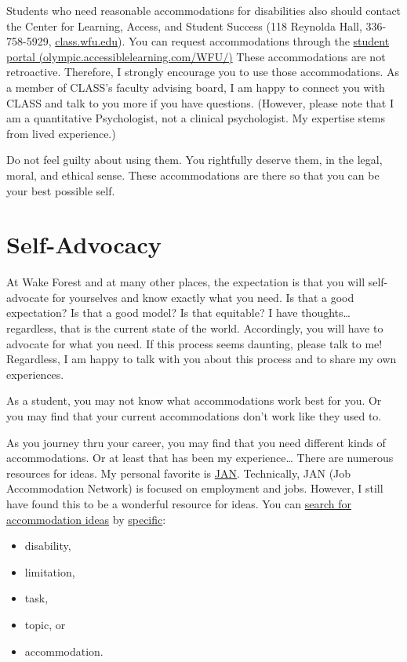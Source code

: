 \documentclass[
]{book}
\providecommand{\tightlist}{%
  \setlength{\itemsep}{0pt}\setlength{\parskip}{0pt}}
\begin{document}
Students who need reasonable accommodations for disabilities also should contact the Center for Learning, Access, and Student Success (118 Reynolda Hall, 336-758-5929, \href{https://class.wfu.edu/}{class.wfu.edu}). You can request accommodations through the \href{https://olympic.accessiblelearning.com/WFU/}{student portal (olympic.accessiblelearning.com/WFU/)} These accommodations are not retroactive. Therefore, I strongly encourage you to use those accommodations. As a member of CLASS's faculty advising board, I am happy to connect you with CLASS and talk to you more if you have questions. (However, please note that I am a quantitative Psychologist, not a clinical psychologist. My expertise stems from lived experience.)

Do not feel guilty about using them.
You rightfully deserve them, in the legal, moral, and ethical sense.
These accommodations are there so that you can be your best possible self.

\section{Self-Advocacy}\label{self-advocacy}

At Wake Forest and at many other places, the expectation is that you will self-advocate for yourselves and know exactly what you need. Is that a good expectation? Is that a good model? Is that equitable? I have thoughts\ldots{} regardless, that is the current state of the world. Accordingly, you will have to advocate for what you need. If this process seems daunting, please talk to me! Regardless, I am happy to talk with you about this process and to share my own experiences.

As a student, you may not know what accommodations work best for you. Or you may find that your current accommodations don't work like they used to.

As you journey thru your career, you may find that you need different kinds of accommodations. Or at least that has been my experience\ldots{} There are numerous resources for ideas.
My personal favorite is \href{https://askjan.org/}{JAN}. Technically, JAN (Job Accommodation Network) is focused on employment and jobs.
However, I still have found this to be a wonderful resource for ideas.
You can \href{https://askjan.org/soar.cfm}{search for accommodation ideas} by \href{https://askjan.org/a-to-z.cfm}{specific}:

\begin{itemize}
\tightlist
\item
  disability,
\item
  limitation,
\item
  task,
\item
  topic, or
\item
  accommodation.
\end{itemize}
\end{document}
